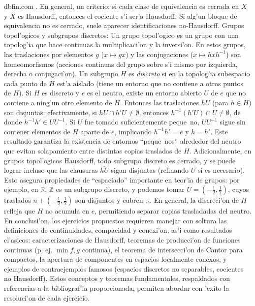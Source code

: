 \documentclass[a4paper,11pt]{article}  %
\begin{document}
dbfin.com
. En general, un criterio: si cada clase de equivalencia es cerrada en $X$ y $X$ es Hausdorff, entonces el cociente s'i ser'a Hausdorff. Si alg'un bloque de equivalencia no es cerrado, suele aparecer identificaciones no-Hausdorff.
Grupos topol'ogicos y subgrupos discretos: Un grupo topol'ogico es un grupo con una topolog'ia que hace continuas la multiplicaci'on y la inversi'on. En estos grupos, las traslaciones por elementos $g$ ($x\mapsto gx$) y las conjugaciones ($x\mapsto hxh^{-1}$) son homeomorfismos (acciones continuas del grupo sobre s'i mismo por izquierda, derecha o conjugaci'on). Un subgrupo $H$ es \emph{discreto} si en la topolog'ia subespacio cada punto de $H$ est'a aislado (tiene un entorno que no contiene a otros puntos de $H$). Si $H$ es discreto y $e$ es el neutro, existe un entorno abierto $U$ de $e$ que no contiene a ning'un otro elemento de $H$. Entonces las traslaciones $hU$ (para $h\in H$) son disjuntas: efectivamente, si $hU\cap h'U\neq\emptyset$, entonces $h^{-1}(h'U)\cap U\neq\emptyset$, de donde $h^{-1}h'\in U U^{-1}$. Si $U$ fue tomado suficientemente peque~no, $U U^{-1}$ sigue sin contener elementos de $H$ aparte de $e$, implicando $h^{-1}h'=e$ y $h=h'$. Este resultado garantiza la existencia de entornos “peque~nos” alrededor del neutro que evitan solapamiento entre distintas copias trasladas de $H$. Adicionalmente, en grupos topol'ogicos Hausdorff, todo subgrupo discreto es cerrado, y se puede lograr incluso que las clausuras $\overline{hU}$ sigan disjuntas (refinando $U$ si es necesario). Esto asegura propiedades de “espaciado” importante en teor'ia de grupos: por ejemplo, en $\mathbb{R}$, $\mathbb{Z}$ es un subgrupo discreto, y podemos tomar $U=(-\frac{1}{2},\frac{1}{2})$, cuyos traslados $n+(-\frac{1}{2},\frac{1}{2})$ son disjuntos y cubren $\mathbb{R}$. En general, la discreci'on de $H$ refleja que $H$ no acumula en $e$, permitiendo separar copias trasladadas del neutro.
En conclusi'on, los ejercicios propuestos requieren manejar con soltura las definiciones de continuidades, compacidad y conexi'on, as'i como resultados cl'asicos: caracterizaciones de Hausdorff, teoremas de producci'on de funciones continuas (p. ej. $\min{f,g}$ continua), el teorema de intersecci'on de Cantor para compactos, la apertura de componentes en espacios localmente conexos, y ejemplos de contraejemplos famosos (espacios discretos no separables, cocientes no Hausdorff). Estos conceptos y teoremas fundamentales, respaldados con referencias a la bibliograf'ia proporcionada, permiten abordar con 'exito la resoluci'on de cada ejercicio.
\end{document}
